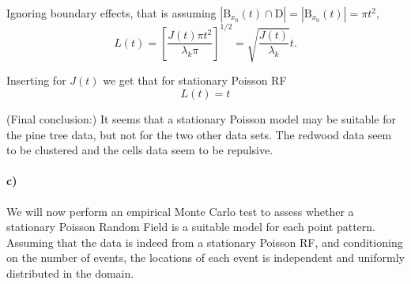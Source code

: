 Ignoring boundary effects, that is assuming $|\textrm{B}_{x_0}(t) \cap \textrm{D}| = |\textrm{B}_{x_0}(t)| = \pi t^2$, 
\begin{equation}
    L(t) = \left[\frac{J(t)\pi t^2}{\lambda_k \pi}\right]^{1/2} = \sqrt{\frac{J(t)}{\lambda_k}}t .
\end{equation}

Inserting for $J(t)$ we get that for stationary Poisson RF
\begin{equation}
    L(t) = t
\end{equation}

(Final conclusion:) It seems that a stationary Poisson model may be suitable for the pine tree data, but not for the two other data sets. The redwood data seem to be clustered and the cells data seem to be repulsive.

\paragraph{c)}
We will now perform an empirical Monte Carlo test to assess whether a stationary Poisson Random Field is a suitable model for each point pattern. Assuming that the data is indeed from a stationary Poisson RF, and conditioning on the number of events, the locations of each event is independent and uniformly distributed in the domain.  
